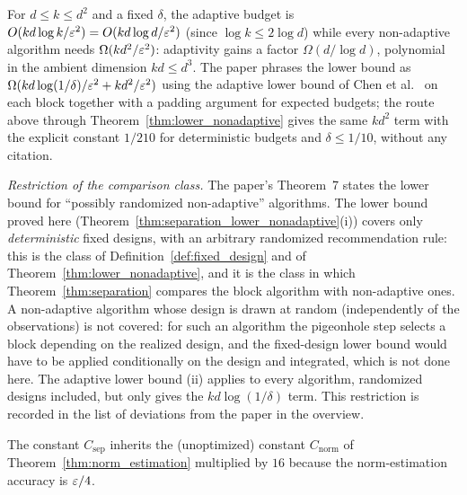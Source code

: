 \begin{remark}\label{rem:separation_gap}
For $d \le k \le d^2$ and a fixed $\delta$, the adaptive budget is
$O(kd\log k/\varepsilon^2) = O(kd\log d/\varepsilon^2)$ (since $\log k \le 2\log d$) while every
non-adaptive algorithm needs $\Omega(kd^2/\varepsilon^2)$: adaptivity gains a factor
$\Omega(d/\log d)$, polynomial in the ambient dimension $kd \le d^3$. The paper phrases the
lower bound as $\Omega(kd\log(1/\delta)/\varepsilon^2 + kd^2/\varepsilon^2)$ using the adaptive lower bound
of Chen et al.\ \cite{chen2024assouad} on each block together with a padding argument for
expected budgets; the route above through Theorem~\ref{thm:lower_nonadaptive} gives the same
$kd^2$ term with the explicit constant $1/210$ for deterministic budgets and $\delta \le 1/10$,
without any citation.

\emph{Restriction of the comparison class.} The paper's Theorem~7 states the lower bound for
``possibly randomized non-adaptive'' algorithms. The lower bound proved here
(Theorem~\ref{thm:separation_lower_nonadaptive}(i)) covers only \emph{deterministic} fixed
designs, with an arbitrary randomized recommendation rule: this is the class of
Definition~\ref{def:fixed_design} and of Theorem~\ref{thm:lower_nonadaptive}, and it is the
class in which Theorem~\ref{thm:separation} compares the block algorithm with non-adaptive
ones. A non-adaptive algorithm whose design is drawn at random (independently of the
observations) is not covered: for such an algorithm the pigeonhole step selects a
block depending on the realized design, and the fixed-design lower bound would have to be
applied conditionally on the design and integrated, which is not done here. The adaptive
lower bound (ii) applies to every algorithm, randomized designs included, but only gives the
$kd\log(1/\delta)$ term. This restriction is recorded in the list of deviations from the
paper in the overview.

The constant $C_{\mathrm{sep}}$ inherits the (unoptimized) constant
$C_{\mathrm{norm}}$ of Theorem~\ref{thm:norm_estimation} multiplied by $16$ because the
norm-estimation accuracy is $\varepsilon/4$.
\end{remark}
